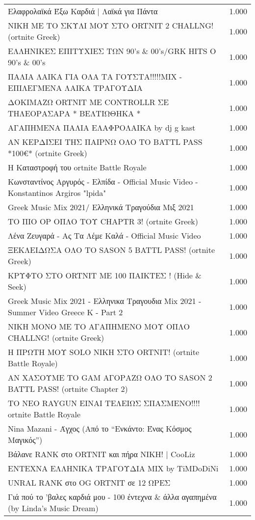 \begin{table}
\begin{tabular}{|p{10cm}|p{1cm}|}
Ελαφρολαϊκά Έξω Καρδιά | Λαϊκά για Πάντα & 1.000 \\
ΝΙΚΗ ΜΕ ΤΟ ΣΚΥΛΙ ΜΟΥ ΣΤΟ ORTNIT 2 CHALLNG! (ortnite Greek) & 1.000 \\
ΕΛΛΗΝΙΚΕΣ ΕΠΙΤΥΧΙΕΣ ΤΩΝ 90's \& 00's/GRK HITS O 90's \& 00's & 1.000 \\
ΠΑΛΙΑ ΛΑΙΚΑ ΓΙΑ ΟΛΑ ΤΑ ΓΟΥΣΤΑ!!!!!MIX - ΕΠΙΛΕΓΜΕΝΑ ΛΑΙΚΑ ΤΡΑΓΟΥΔΙΑ & 1.000 \\
ΔΟΚΙΜΑΖΩ ORTNIT ΜΕ CONTROLLR ΣΕ ΤΗΛΕΟΡΑΣΑΡΑ * ΒΕΛΤΙΩΘΗΚΑ * & 1.000 \\
ΑΓΑΠΗΜΕΝΑ ΠΑΛΙΑ  ΕΛΑΦΡΟΛΑΙΚΑ by dj g kast & 1.000 \\
ΑΝ ΚΕΡΔΙΣΕΙ ΤΗΣ ΠΑΙΡΝΩ ΟΛΟ ΤΟ BATTL PASS *100€* (ortnite Greek) & 1.000 \\
Η Καταστροφή του ortnite Battle Royale & 1.000 \\
Κωνσταντίνος Αργυρός - Ελπίδα - Official Music Video - Konstantinos Argiros "lpida" & 1.000 \\
Greek Music Mix 2021/ Ελληνικά Τραγούδια Μιξ 2021 & 1.000 \\
ΤΟ ΠΙΟ OP ΟΠΛΟ ΤΟΥ CHAPTR 3! (ortnite Greek) & 1.000 \\
Λένα Ζευγαρά - Ας Τα Λέμε Καλά - Official Music Video & 1.000 \\
ΞΕΚΛΕΙΔΩΣΑ ΟΛΟ ΤΟ SASON 5 BATTL PASS! (ortnite Greek) & 1.000 \\
ΚΡΥΦΤΟ ΣΤΟ ORTNIT ΜΕ 100 ΠΑΙΚΤΕΣ ! (Hide \& Seek) & 1.000 \\
Greek Music Mix 2021 - Ελληνικα Τραγουδια Mix 2021 - Summer Video Greece K - Part 2 & 1.000 \\
ΝΙΚΗ ΜΟΝΟ ΜΕ ΤΟ ΑΓΑΠΗΜΕΝΟ ΜΟΥ ΟΠΛΟ CHALLNG! (ortnite Greek) & 1.000 \\
Η ΠΡΩΤΗ ΜΟΥ SOLO ΝΙΚΗ ΣΤΟ ORTNIT! (ortnite Battle Royale) & 1.000 \\
ΑΝ ΧΑΣΟΥΜΕ ΤΟ GAM ΑΓΟΡΑΖΩ ΟΛΟ ΤΟ SASON 2 BATTL PASS! (ortnite Chapter 2) & 1.000 \\
ΤΟ ΝΕΟ RAYGUN ΕΙΝΑΙ ΤΕΛΕΙΩΣ ΣΠΑΣΜΕΝΟ!!!! ortnite Battle Royale & 1.000 \\
Nina Mazani - Άγχος (Από το “Ενκάντο: Ένας Κόσμος Μαγικός”) & 1.000 \\
Βάλανε RANK στο ORTNIT και πήρα ΝΙΚΗ! | CooLiz & 1.000 \\
ΕΝΤΕΧΝΑ ΕΛΛΗΝΙΚΑ ΤΡΑΓΟΥΔΙΑ MIX  by TiMDoDiNi & 1.000 \\
UNRAL RANK στο OG ORTNIT σε 12 ΩΡΕΣ & 1.000 \\
Γιά πού το 'βαλες καρδιά μου - 100 έντεχνα \& άλλα αγαπημένα (by Linda's Music Dream) & 1.000 \\

\end{tabular}
\end{table}
